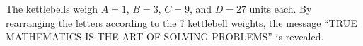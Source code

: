 


  The kettlebells weigh \(A=1\), \(B=3\), \(C=9\), and \(D=27\) units each.
  By rearranging the letters according to the \(?\) kettlebell weights,
  the message ``TRUE MATHEMATICS IS THE ART OF SOLVING PROBLEMS''
  is revealed.
